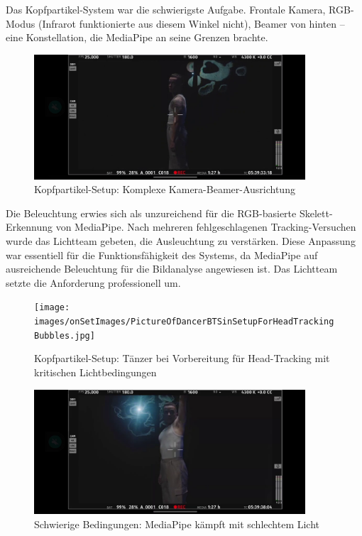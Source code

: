 Das Kopfpartikel-System war die schwierigste Aufgabe. Frontale Kamera, RGB-Modus (Infrarot funktionierte aus diesem Winkel nicht), Beamer von hinten – eine Konstellation, die MediaPipe an seine Grenzen brachte.

\begin{figure}[h]
   \centering
   \includegraphics[width=0.9\textwidth]{images/HeadTracking_HQCamera.png}
   \caption{Kopfpartikel-Setup: Komplexe Kamera-Beamer-Ausrichtung}
   \label{fig:head_setup}
\end{figure}

Die Beleuchtung erwies sich als unzureichend für die RGB-basierte Skelett-Erkennung von MediaPipe. Nach mehreren fehlgeschlagenen Tracking-Versuchen wurde das Lichtteam gebeten, die Ausleuchtung zu verstärken. Diese Anpassung war essentiell für die Funktionsfähigkeit des Systems, da MediaPipe auf ausreichende Beleuchtung für die Bildanalyse angewiesen ist. Das Lichtteam setzte die Anforderung professionell um.

\begin{figure}[h]
   \centering
   \texttt{[image: images/onSetImages/PictureOfDancerBTSinSetupForHeadTrackingBubbles.jpg]}
   \caption{Kopfpartikel-Setup: Tänzer bei Vorbereitung für Head-Tracking mit kritischen Lichtbedingungen}
   \label{fig:dancer_head_tracking}
\end{figure}

\begin{figure}[h]
   \centering
   \includegraphics[width=0.9\textwidth]{images/HeadTrackingLeftSideOfHeadWithHeadClearlyAttached.png}
   \caption{Schwierige Bedingungen: MediaPipe kämpft mit schlechtem Licht}
   \label{fig:low_light_tracking}
\end{figure}

